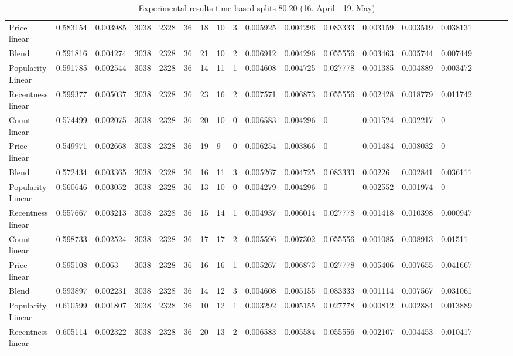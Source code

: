 \begin{table}[H]
{\begin{tabular}{*{19}l}
Price linear		&	0.583154 &	0.003985 &	3038 &	2328 &	36 &	18 &	10 &	3 &	0.005925 &	0.004296 &	0.083333 &	0.003159 &	0.003519 &	0.038131 &	 \\
Blend				&	0.591816 &	0.004274 &	3038 &	2328 &	36 &	21 &	10 &	2 &	0.006912 &	0.004296 &	0.055556 &	0.003463 &	0.005744 &	0.007449 &	 \\
Popularity Linear	&	0.591785 &	0.002544 &	3038 &	2328 &	36 &	14 &	11 &	1 &	0.004608 &	0.004725 &	0.027778 &	0.001385 &	0.004889 &	0.003472 &	 \\
Recentness linear	&	0.599377 &	0.005037 &	3038 &	2328 &	36 &	23 &	16 &	2 &	0.007571 &	0.006873 &	0.055556 &	0.002428 &	0.018779 &	0.011742 &	 \\
Count linear		&	0.574499 &	0.002075 &	3038 &	2328 &	36 &	20 &	10 &	0 &	0.006583 &	0.004296 &	0 		 &	0.001524 &	0.002217 &	0 		 &	 \\
Price linear		&	0.549971 &	0.002668 &	3038 &	2328 &	36 &	19 &	9  &	0 &	0.006254 &	0.003866 &	0 		 &	0.001484 &	0.008032 &	0 		 &	 \\
Blend				&	0.572434 &	0.003365 &	3038 &	2328 &	36 &	16 &	11 &	3 &	0.005267 &	0.004725 &	0.083333 &	0.00226  &	0.002841 &	0.036111 &	 \\
Popularity Linear	&	0.560646 &	0.003052 &	3038 &	2328 &	36 &	13 &	10 &	0 &	0.004279 &	0.004296 &	0 		 &	0.002552 &	0.001974 &	0 		 &	 \\
Recentness linear	&	0.557667 &	0.003213 &	3038 &	2328 &	36 &	15 &	14 &	1 &	0.004937 &	0.006014 &	0.027778 &	0.001418 &	0.010398 &	0.000947 &	 \\
Count linear		&	0.598733 &	0.002524 &	3038 &	2328 &	36 &	17 &	17 &	2 &	0.005596 &	0.007302 &	0.055556 &	0.001085 &	0.008913 &	0.01511  &	 \\
Price linear		&	0.595108 &	0.0063 &	3038 &	2328 &	36 &	16 &	16 &	1 &	0.005267 &	0.006873 &	0.027778 &	0.005406 &	0.007655 &	0.041667 &	 \\
Blend				&	0.593897 &	0.002231 &	3038 &	2328 &	36 &	14 &	12 &	3 &	0.004608 &	0.005155 &	0.083333 &	0.001114 &	0.007567 &	0.031061 &	 \\
Popularity Linear	&	0.610599 &	0.001807 &	3038 &	2328 &	36 &	10 &	12 &	1 &	0.003292 &	0.005155 &	0.027778 &	0.000812 &	0.002884 &	0.013889 &	 \\
Recentness linear	&	0.605114 &	0.002322 &	3038 &	2328 &	36 &	20 &	13 &	2 &	0.006583 &	0.005584 &	0.055556 &	0.002107 &	0.004453 &	0.010417 &	 \\

\bottomrule
\end{tabular}
}
\caption{Experimental results time-based splits 80:20 (16. April - 19. May)}
\end{table}

